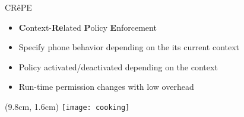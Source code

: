\begin{frame}{CR\^ePE}

\fontsize{15pt}{0}\selectfont

\vspace*{0.2cm}

\begin{itemize}
  \item \textbf{C}ontext-\textbf{Re}lated \textbf{P}olicy \textbf{E}nforcement

  \vfill

  \item Specify phone behavior depending on the its current context

  \vfill

  \item Policy activated/deactivated depending on the context

  \vfill 

  \item Run-time permission changes with low overhead
\end{itemize}

\begin{textblock*}{1cm}(9.8cm, 1.6cm)
    \texttt{[image: cooking]}
\end{textblock*}

\end{frame}